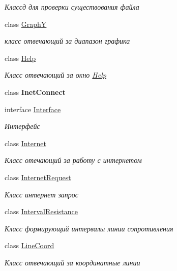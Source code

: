 \begin{DoxyCompactItemize}
\begin{DoxyCompactList}\small\item\em Классд для проверки существования файла \end{DoxyCompactList}\item 
class \hyperlink{class_client_1_1_graph_y}{GraphY}
\begin{DoxyCompactList}\small\item\em класс отвечающий за диапазон графика \end{DoxyCompactList}\item 
class \hyperlink{class_client_1_1_help}{Help}
\begin{DoxyCompactList}\small\item\em Класс отвечающий за окно \hyperlink{class_client_1_1_help}{Help} \end{DoxyCompactList}\item 
class {\bfseries Inet\+Connect}
\item 
interface \hyperlink{interface_client_1_1_interface}{Interface}
\begin{DoxyCompactList}\small\item\em Интерфейс \end{DoxyCompactList}\item 
class \hyperlink{class_client_1_1_internet}{Internet}
\begin{DoxyCompactList}\small\item\em Класс отечающий за работу с интернетом \end{DoxyCompactList}\item 
class \hyperlink{class_client_1_1_internet_request}{Internet\+Request}
\begin{DoxyCompactList}\small\item\em Класс интернет запрос \end{DoxyCompactList}\item 
class \hyperlink{class_client_1_1_interval_resistance}{Interval\+Resistance}
\begin{DoxyCompactList}\small\item\em Класс формирующий интервалы линии сопротивления \end{DoxyCompactList}\item 
class \hyperlink{class_client_1_1_line_coord}{Line\+Coord}
\begin{DoxyCompactList}\small\item\em Класс отвечающий за координатные линии \end{DoxyCompactList}\item 

\end{DoxyCompactItemize}
